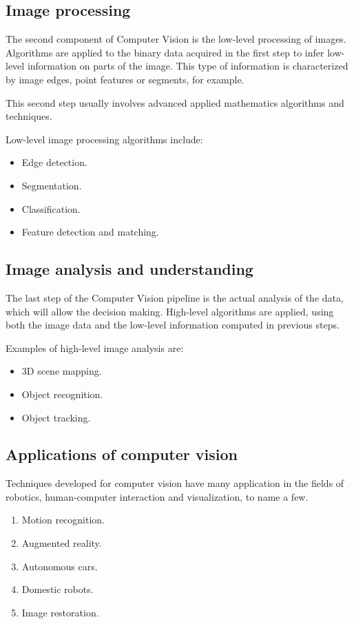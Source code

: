 \subsection{Image processing}
The second component of Computer Vision is the low-level processing of images. Algorithms are applied to the binary data acquired in the first step to infer low-level information on parts of the image. This type of information is characterized by image edges, point features or segments, for example.

This second step usually involves advanced applied mathematics algorithms and techniques.

Low-level image processing algorithms include:
\begin{itemize}
    \item Edge detection.
    \item Segmentation.
    \item Classification.
    \item Feature detection and matching.
\end{itemize}

\subsection{Image analysis and understanding}
The last step of the Computer Vision pipeline is the actual analysis of the data, which will allow the decision making.
High-level algorithms are applied, using both the image data and the low-level information computed in previous steps.

Examples of high-level image analysis are:
\begin{itemize}
    \item 3D scene mapping.
    \item Object recognition.
    \item Object tracking.
\end{itemize}
\subsection{Applications of computer vision}
Techniques developed for computer vision have many application in the fields of robotics, human-computer interaction and visualization, to name a few.
\begin{enumerate}
    \item Motion recognition.
    \item Augmented reality.
    \item Autonomous cars.
    \item Domestic robots.
    \item Image restoration.
\end{enumerate}
